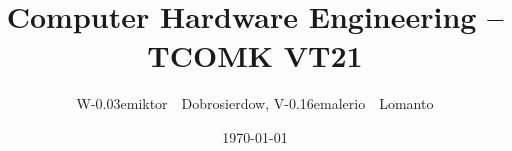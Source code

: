 
\newcommand*\kthmail{\mailto{wiktord@kth.se}}
\newcommand*\personalmail{}
\newcommand*\firstname{W\kern-0.03em{}iktor}
\newcommand*\lastname{Dobrosierdow}
\newcommand*\ddob{24}
\newcommand*\mmob{05}
\newcommand*\yyob{2000}
\newcommand*\pnlast{T112}


\newcommand*\fullname{\firstname~~\lastname}
\makeatletter
\newcommand*\personnummer{\expandafter\@gobbletwo\yyob\mmob\ddob-\pnlast}
\makeatother
\newcommand*\isodob{\yyob--\mmob--\ddob}
\newcommand*\thedob{Date of birth: \isodob}
\newcommand*\thepn{Personnummer: \texttt{\personnummer{}}}
\newcommand*\themail{E-mail: \kthmail{}}
\newcommand*\myauthor{\fullname}

\newcommand*\Bkthmail{\mailto{lomanto@kth.se}}
\newcommand*\Bpersonalmail{\mailto{gv.lomanto@gmail.com}}
\newcommand*\Bfirstname{V\kern-0.16em{}alerio}
\newcommand*\Blastname{Lomanto}
\newcommand*\Bddob{17}
\newcommand*\Bmmob{07}
\newcommand*\Byyob{1995}
\newcommand*\Bpnlast{0174}

\newcommand*\Bfullname{\Bfirstname~~\Blastname}
\makeatletter
\newcommand*\Bpersonnummer{\expandafter\@gobbletwo\Byyob\Bmmob\Bddob-\Bpnlast}
\makeatother
\newcommand*\Bisodob{\Byyob--\Bmmob--\Bddob}
\newcommand*\Bthedob{Date of birth: \Bisodob}
\newcommand*\Bthepn{Personnummer: \texttt{\Bpersonnummer{}}}
\newcommand*\Bthemail{E-mail: \mailsbox{\Bkthmail{}\\\Bpersonalmail{}}}
\newcommand*\Bmyauthor{\Bfullname}

\newcommand*\makeauthor[1][{}]{
    \begin{minipage}[t]{0.45\textwidth}
    \expandafter\textsc{\csname #1myauthor\endcsname} \par
    \csname #1thedob \endcsname \par
    \csname #1thepn \endcsname \par
    \csname #1themail \endcsname
    \end{minipage}
}

\newcommand*\mysubtitle{Program Loader -- Advanced Project}
\newcommand*\thisyear{2021}
\newcommand*\thiscourse{Computer Hardware Engineering}
\newcommand*\thisprogram{TCOMK}
\newcommand*\thisperiod{VT21}

\author{\myauthor, \Bmyauthor}
\title{\thiscourse{} -- \thisprogram{} \thisperiod{}}
\date{\today}

\newcommand*\phylologo{ %
    \texttt{[image: phylolines]} %
}
\newcommand*\logo{\phylologo}

